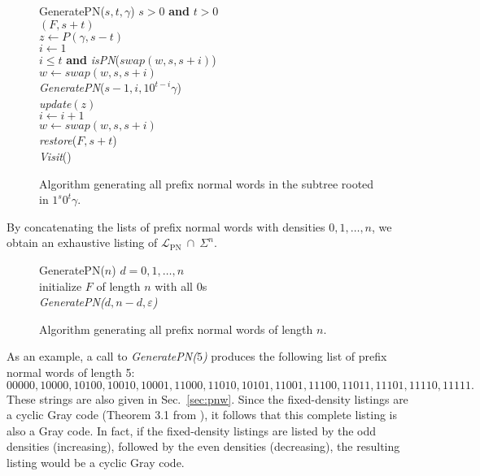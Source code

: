 \documentclass[11pt,a4paper]{llncs}
\def\swap{\textit{swap}}
\renewcommand{\epsilon}{\varepsilon}
\newcommand{\LPN}{{\mathcal L}_{\textrm{PN}}}
\begin{document}
\begin{figure}
\begin{algorithm}{GeneratePN($s,t,\gamma$)}{
}
\qif $s>0$ {\bf and} $t>0$ \\
$(F,s+t)$\\
$z \gets P(\gamma,s-t)$ \\
$i \gets 1$\\
\qwhile $i \leq t$ {\bf and} {\em isPN}($\swap(w,s,s+i)$)\\
\qdo $w \gets \swap(w,s,s+i)$\\
{\em GeneratePN}($s-1,i,10^{t-i}\gamma$)\\
{\em update}$(z)$ \\
$i \gets i+1$\\
$w \gets \swap(w,s,s+i)$
\qend \\
{\em restore}($F,s+t$)
\qfi \\
{\em Visit}()
\end{algorithm}
\vspace{-4mm}
\caption{Algorithm generating all prefix normal words in the subtree rooted in $1^s0^t\gamma$.\label{algo:genPN1}}
\end{figure}

\noindent  By concatenating the lists of prefix normal words with densities $0,1,\ldots , n$, we obtain an exhaustive listing of $\LPN \ \cap  \ \Sigma^n$.


\begin{figure}
\begin{algorithm}{GeneratePN($n$)}{
}
\qfor $d=0, 1, \ldots , n$\\
\qdo initialize $F$ of length $n$ with all $0$s\\
{\em GeneratePN($d,n-d,\epsilon$)}
\qend
\end{algorithm}
\caption{Algorithm generating all prefix normal words of length $n$.\label{algo:genPN2}}
\end{figure}

As an example, a call to {\em GeneratePN($5$)} produces the following list of prefix normal words of length 5:
\small
\[ 00000, 10000, 10100, 10010, 10001, 11000, 11010, 10101, 11001, 11100, 11011, 11101, 11110, 11111.\]
\normalsize
These strings are also given in Sec.~\ref{sec:pnw}.  Since the fixed-density listings are a cyclic Gray code (Theorem 3.1 from \cite{RSW12}), it follows that this complete listing is also a Gray code.  In fact, if the fixed-density listings are listed by the odd densities (increasing), followed by the even densities (decreasing), the resulting listing would be a cyclic Gray code.
\end{document}
